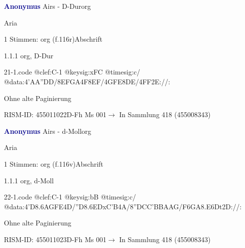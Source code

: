 \documentclass[twocolumn, 12pt]{book}
\begin{document}
\par \vspace{16pt} \textcolor{darkblue}{\textbf{Anonymus  }}\hfillplus{\textbf{[21]}}\newline Airs - D-Dur\newline org
\par \begin{itshape}[f.116r, heading:] Aria\end{itshape} 
\par \textcolor{darkblue}{}  1 Stimmen: org  (f.116r)\newline Abschrift
\par 1.1.1  org, D-Dur  
\begin{filecontents*}{21-1.code}
@clef:C-1
@keysig:xFC
@timesig:c/
@data:4'AA''DD/{8EFGA}4F{8EF}/4GFE{8DE}/4FF2E://:
\end{filecontents*}
\newline %
\par Ohne alte Paginierung
\par RISM-ID: 455011022\newline D-Fh  Ms 001\newline $\rightarrow$ In Sammlung 418 (455008343)
      
\par \vspace{16pt} \textcolor{darkblue}{\textbf{Anonymus  }}\hfillplus{\textbf{[22]}}\newline Airs - d-Moll\newline org
\par \begin{itshape}[f.116v, heading:] Aria\end{itshape} 
\par \textcolor{darkblue}{}  1 Stimmen: org  (f.116v)\newline Abschrift
\par 1.1.1  org, d-Moll  
\begin{filecontents*}{22-1.code}
@clef:C-1
@keysig:bB
@timesig:c/
@data:4'D{8.6AG}{FE}4D/''D{8.6ED}{xC'B}4A/{8''DC}{C'B}{BA}{AG}/{F6GA}{8.E6Dt}2D://:
\end{filecontents*}
\newline %
\par Ohne alte Paginierung
\par RISM-ID: 455011023\newline D-Fh  Ms 001\newline $\rightarrow$ In Sammlung 418 (455008343)
      
\end{document}
